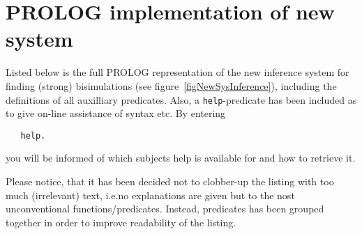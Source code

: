 \chapter[PROLOG implementation of new system]{PROLOG implementation of new system}\label{appPrologImp}

Listed below is the full PROLOG representation of the new inference system for finding (strong) bisimulations (see figure~\ref{figNewSysInference}), including the definitions of all auxilliary predicates. Also, a \verb!help!-predicate has been included as to give on-line assistance of syntax etc. By entering
\begin{verbatim}
   help.
\end{verbatim}
you will be informed of which subjects help is available for and how to retrieve it.

Please notice, that it has been decided not to clobber-up the listing with too much (irrelevant) text, i.e.\@ no explanations are given but to the nost unconventional functions/predicates. Instead, predicates has been grouped together in order to improve readability of the listing.

\newpage

%
